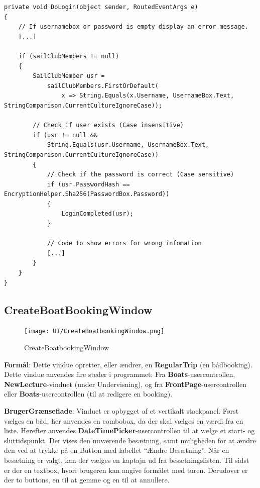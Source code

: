 \begin{lstlisting}[frame=single, caption=DoLogin, label=dologin]
private void DoLogin(object sender, RoutedEventArgs e)
{
    // If usernamebox or password is empty display an error message.
    [...]
 
    if (sailClubMembers != null)
    {
        SailClubMember usr =
            sailClubMembers.FirstOrDefault(
                x => String.Equals(x.Username, UsernameBox.Text, StringComparison.CurrentCultureIgnoreCase));
 
        // Check if user exists (Case insensitive)
        if (usr != null &&
            String.Equals(usr.Username, UsernameBox.Text, StringComparison.CurrentCultureIgnoreCase))
        {
            // Check if the password is correct (Case sensitive)
            if (usr.PasswordHash == EncryptionHelper.Sha256(PasswordBox.Password))
            {
                LoginCompleted(usr);
            } 
 
            // Code to show errors for wrong infomation
            [...]
        }
    }
}
\end{lstlisting}


\subsection{CreateBoatBookingWindow}

\begin{figure}
    \label{img:boatBookWindow}
    \vspace{-20pt}
    \begin{center}
        \texttt{[image: UI/CreateBoatbookingWindow.png]}
    \end{center}
    \vspace{-20pt}
    \caption{CreateBoatbookingWindow}
    \vspace{-30pt}
\end{figure}

\textbf{Formål}: 
Dette vindue opretter, eller ændrer, en \textbf{RegularTrip} (en bådbooking).
Dette vindue anvendes fire steder i programmet: Fra \textbf{Boats}-usercontrollen, \textbf{NewLecture}-vinduet (under Undervisning), og fra \textbf{FrontPage}-usercontrollen eller \textbf{Boats}-usercontrollen (til at redigere en booking). 

\textbf{BrugerGrænseflade}: 
Vinduet er opbygget af et vertikalt stackpanel.
Først vælges en båd, her anvendes en combobox, da der skal vælges en værdi fra en liste.
Herefter anvendes \textbf{DateTimePicker}-usercontrollen til at vælge et start- og sluttidspunkt.
Der vises den nuværende besætning, samt muligheden for at ændre den ved at trykke på en Button med labellet ``Ændre Besætning''.
Når en besætning er valgt, kan der vælges en kaptajn ud fra besætningslisten.
Til sidst er der en textbox, hvori brugeren kan angive formålet med turen.
Derudover er der to buttons, en til at gemme og en til at annullere.

